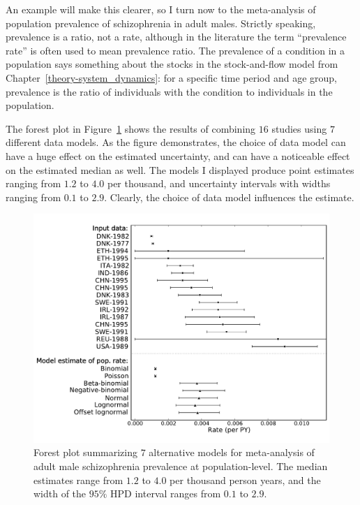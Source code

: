 An example will make this clearer, so I turn now to the meta-analysis
of population prevalence of schizophrenia in adult males.  Strictly
speaking, prevalence is a ratio, not a rate, although in the
literature the term ``prevalence rate'' is often used to mean
prevalence ratio.  The prevalence of a condition in a population says
something about the stocks in the stock-and-flow model from
Chapter~\ref{theory-system_dynamics}: for a specific time period and
age group, prevalence is the ratio of individuals with the condition
to individuals in the population.

The forest plot in Figure~\ref{rate-model-schiz-forest} shows the
results of combining $16$ studies using $7$ different data models.  As
the figure demonstrates, the choice of data model can have a huge
effect on the estimated uncertainty, and can have a noticeable effect
on the estimated median as well. The models I displayed produce point
estimates ranging from $1.2$ to $4.0$ per thousand, and uncertainty
intervals with widths ranging from $0.1$ to $2.9$.  Clearly, the
choice of data model influences the estimate.

\begin{figure}[h]
\begin{center}
\includegraphics[width=\textwidth]{schiz_forest.pdf}
\caption{Forest plot summarizing $7$ alternative models for
  meta-analysis of adult male schizophrenia prevalence at
  population-level.  The median estimates range from
  $1.2$ to
  $4.0$ per thousand person years, and the width of the
  $95\%$ HPD interval ranges from
  $0.1$ to
  $2.9$.}
\label{rate-model-schiz-forest}
\end{center}
\end{figure}

